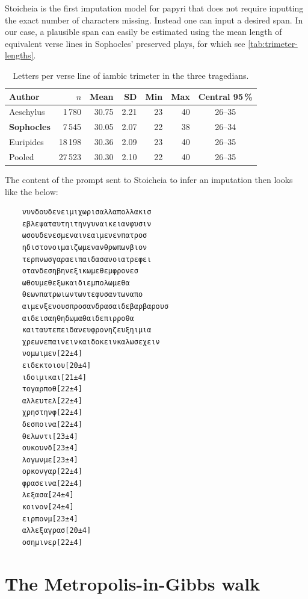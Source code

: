 \documentclass{article}
\theoremstyle{plain}
\theoremstyle{definition}
\theoremstyle{remark}
\begin{document}
Stoicheia is the first imputation model for papyri that does not require inputting the exact number of characters missing. Instead one can input a desired span. In our case, a plausible span can easily be estimated using the mean length of equivalent verse lines in Sophocles' preserved plays, for which see \autoref{tab:trimeter-lengths}.

\begin{table}[htbp]
  \centering
  \begin{tabular}{lrrrrrc}
    \toprule
    Author    & $n$    & Mean  & SD   & Min & Max & Central 95\,\% \\
    \midrule
    Aeschylus &  1\,780 & 30.75 & 2.21 & 23 & 40 & 26--35 \\
    \textbf{Sophocles} &  7\,545 & 30.05 & 2.07 & 22 & 38 & 26--34 \\
    Euripides & 18\,198 & 30.36 & 2.09 & 23 & 40 & 26--35 \\
    \midrule
    Pooled    & 27\,523 & 30.30 & 2.10 & 22 & 40 & 26--35 \\
    \bottomrule
  \end{tabular}
  \caption{Letters per verse line of iambic trimeter in the three tragedians.}
  \label{tab:trimeter-lengths}
\end{table}

The content of the prompt sent to Stoicheia to infer an imputation then looks like the below: 

\label{tereus}
    \begin{verbatim}
    νυνδουδενειμιχωρισαλλαπολλακισ
    εβλεψαταυτηιτηνγυναικειανφυσιν
    ωσουδενεσμεναινεαιμενενπατροσ
    ηδιστονοιμαιζωμενανθρωπωνβιον
    τερπνωσγαραειπαιδασανοιατρεφει
    οτανδεσηβηνεξικωμεθεμφρονεσ
    ωθουμεθεξωκαιδιεμπολωμεθα
    θεωνπατρωιωντωντεφυσαντωναπο
    αιμενξενουσπροσανδρασαιδεβαρβαρουσ
    αιδεισαηθηδωμαθαιδεπιρροθα
    καιταυτεπειδανευφρονηζευξηιμια
    χρεωνεπαινεινκαιδοκεινκαλωσεχειν
    νομωιμεν[22±4]
    ειδεκτοιου[20±4]
    ιδοιμικαι[21±4]
    τογαρποθ[22±4]
    αλλευτελ[22±4]
    χρηστηνφ[22±4]
    δεσποινα[22±4]
    θελωντι[23±4]
    ουκουνδ[23±4]
    λογωνμε[23±4]
    ορκονγαρ[22±4]
    φρασεινα[22±4]
    λεξασα[24±4]
    κοινον[24±4]
    ειρπονμ[23±4]
    αλλεξαγρασ[20±4]
    οσημινερ[22±4]
    \end{verbatim}

\newpage
\section{The Metropolis-in-Gibbs walk}\label{walk}
\end{document}
